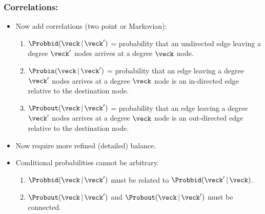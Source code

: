 \begin{frame}
  \frametitle{Correlations:}
  
  \begin{itemize}
  \item<1->
    Now add correlations (two point or Markovian):
    \begin{enumerate}
    \item<2->
    $
    \Probbid(\veck\,|\, \veck')
    $
    = 
    probability that an undirected edge leaving 
    a degree $\veck'$ nodes arrives at a degree $\veck$ node.
    \item<3-> 
    $
    \Probin(\veck\,|\, \veck')
    $
    = probability that an edge leaving 
    a degree $\veck'$ nodes arrives at a degree $\veck$ node
    is an in-directed edge
    relative to the destination node.
    \item<4-> 
    $
    \Probout(\veck\,|\, \veck')
    $
    = probability that an edge leaving 
    a degree $\veck'$ nodes arrives at a degree $\veck$ node
    is an out-directed edge
    relative to the destination node.
    \end{enumerate}
  \item<5->
    Now require more refined (detailed) balance.
  \item<6->
    Conditional probabilities cannot be arbitrary.
    \begin{enumerate}
    \item<7-> 
      $\Probbid(\veck\,|\, \veck')$ must be related
      to $\Probbid(\veck'\,|\, \veck)$.
    \item<8->
      $\Probout(\veck\,|\, \veck')$ 
      and $\Probout(\veck\,|\, \veck')$ 
      must be connected.
    \end{enumerate}
    \end{itemize}

\end{frame}

